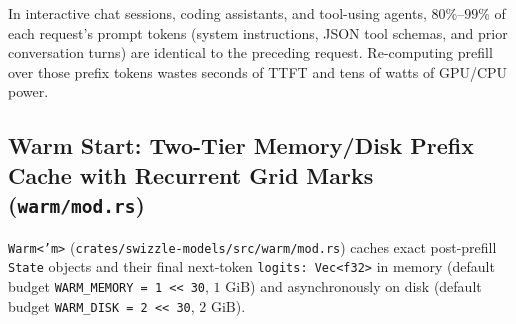 \documentclass[10pt,a4paper]{article}
\theoremstyle{swzstyle}
\newcommand{\code}[1]{\texttt{#1}}
\begin{document}
In interactive chat sessions, coding assistants, and tool-using agents, $80\%\text{--}99\%$ of each request's prompt tokens (system instructions, JSON tool schemas, and prior conversation turns) are identical to the preceding request. Re-computing prefill over those prefix tokens wastes seconds of TTFT and tens of watts of GPU/CPU power.

\subsection{Warm Start: Two-Tier Memory/Disk Prefix Cache with Recurrent Grid Marks (\texttt{warm/mod.rs})}

\code{Warm<'m>} (\code{crates/swizzle-models/src/warm/mod.rs}) caches exact post-prefill \code{State} objects and their final next-token \code{logits: Vec<f32>} in memory (default budget \code{WARM\_MEMORY = 1 << 30}, $1\text{ GiB}$) and asynchronously on disk (default budget \code{WARM\_DISK = 2 << 30}, $2\text{ GiB}$).
\end{document}
